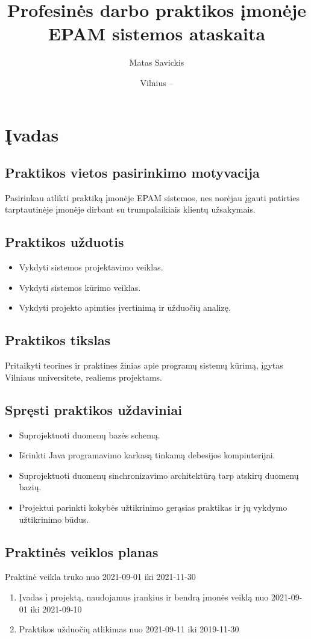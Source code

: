 \documentclass{VUMIFPSkursinis}
\title{Profesinės darbo praktikos įmonėje EPAM sistemos ataskaita}
\author{Matas Savickis}
\date{Vilnius – \the\year}
\begin{document}
\maketitle
\addtocounter{page}{1}
\tableofcontents

\section{Įvadas}
	\subsection{Praktikos vietos pasirinkimo motyvacija}
		Pasirinkau atlikti praktiką įmonėje EPAM sistemos, nes norėjau įgauti patirties tarptautinėje
		įmonėje dirbant su trumpalaikiais klientų užsakymais.
	\subsection{Praktikos užduotis}
		\begin{itemize}
			\item{Vykdyti sistemos projektavimo veiklas.}
			\item{Vykdyti sistemos kūrimo veiklas.}
			\item{Vykdyti projekto apimties įvertinimą ir užduočių analizę.}
		\end{itemize}

	\subsection{Praktikos tikslas}
		Pritaikyti teorines ir praktines žinias apie programų sistemų kūrimą, įgytas Vilniaus universitete, realiems projektams.

	\subsection{Spręsti praktikos uždaviniai}
		\begin{itemize}
			\item{Suprojektuoti duomenų bazės schemą.}
			\item{Išrinkti Java programavimo karkasą tinkamą debesijos kompiuterijai.}
			\item{Suprojektuoti duomenų sinchronizavimo architektūrą tarp atskirų duomenų bazių.}
			\item{Projektui parinkti kokybės užtikrinimo gerąsias praktikas ir jų vykdymo užtikrinimo būdus.}	
		\end{itemize}
	\subsection{Praktinės veiklos planas}
		Praktinė veikla truko nuo 2021-09-01 iki 2021-11-30
		\begin{enumerate}
			\item{Įvadas į projektą, naudojamus įrankius ir bendrą įmonės veiklą nuo 2021-09-01 iki 2021-09-10}
			\item{Praktikos užduočių atlikimas nuo 2021-09-11 iki 2019-11-30}
		\end{enumerate}
\end{document}

